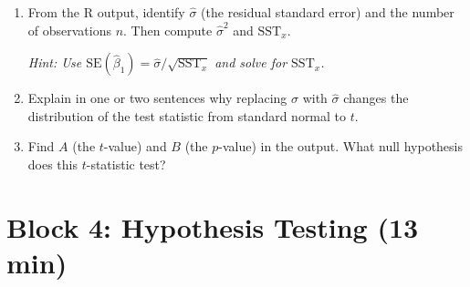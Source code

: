 \documentclass[11pt,a4paper]{article}
\begin{document}
\begin{enumerate}[label=(\alph*)]
\item From the R output, identify $\hat{\sigma}$ (the residual standard error) and the number of observations $n$. Then compute $\hat{\sigma}^2$ and $\text{SST}_x$.

\textcolor{hintcolor}{\emph{Hint: Use $\text{SE}(\hat{\beta}_1) = \hat{\sigma}/\sqrt{\text{SST}_x}$ and solve for $\text{SST}_x$.}}

\begin{answerbox}
\vspace{5cm}
\end{answerbox}

\newpage
\item Explain in one or two sentences why replacing $\sigma$ with $\hat{\sigma}$ changes the distribution of the test statistic from standard normal to $t$.

\begin{answerbox}
\vspace{3.5cm}
\end{answerbox}

\item Find $A$ (the $t$-value) and $B$ (the $p$-value) in the output. What null hypothesis does this $t$-statistic test?

\begin{answerbox}
\vspace{4.5cm}
\end{answerbox}

\end{enumerate}

\section{Block 4: Hypothesis Testing \textnormal{(13 min)}}
\end{document}
